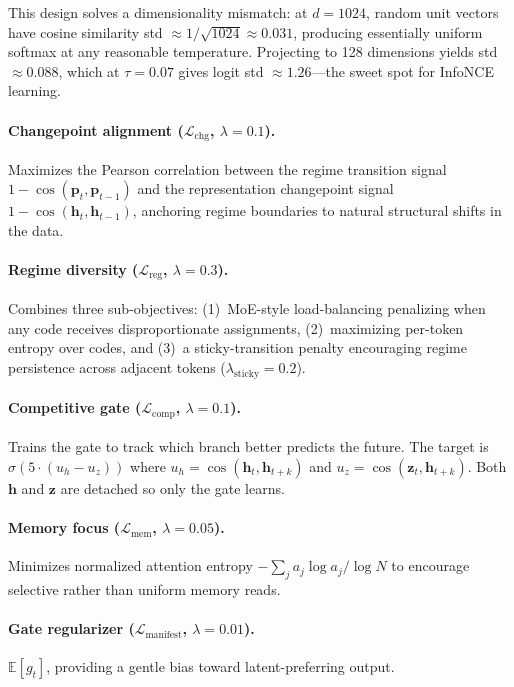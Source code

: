 \documentclass{article}
\begin{document}
This design solves a dimensionality mismatch: at $d{=}1024$, random unit
vectors have cosine similarity std ${\approx}1/\sqrt{1024} \approx 0.031$,
producing essentially uniform softmax at any reasonable temperature. Projecting
to 128 dimensions yields std ${\approx}0.088$, which at $\tau{=}0.07$ gives
logit std ${\approx}1.26$---the sweet spot for InfoNCE learning.

\paragraph{Changepoint alignment ($\mathcal{L}_\text{chg}$, $\lambda{=}0.1$).}
Maximizes the Pearson correlation between the regime transition signal
$1 - \cos(\mathbf{p}_t, \mathbf{p}_{t-1})$ and the representation changepoint
signal $1 - \cos(\mathbf{h}_t, \mathbf{h}_{t-1})$, anchoring regime boundaries
to natural structural shifts in the data.

\paragraph{Regime diversity ($\mathcal{L}_\text{reg}$, $\lambda{=}0.3$).}
\label{sec:regime_loss}
Combines three sub-objectives: (1)~MoE-style load-balancing penalizing when any
code receives disproportionate assignments, (2)~maximizing per-token entropy
over codes, and (3)~a sticky-transition penalty encouraging regime persistence
across adjacent tokens ($\lambda_\text{sticky}{=}0.2$).

\paragraph{Competitive gate ($\mathcal{L}_\text{comp}$, $\lambda{=}0.1$).}
Trains the gate to track which branch better predicts the future. The target is
$\sigma(5 \cdot (u_h - u_z))$ where $u_h = \cos(\mathbf{h}_t, \mathbf{h}_{t+k})$
and $u_z = \cos(\mathbf{z}_t, \mathbf{h}_{t+k})$. Both $\mathbf{h}$ and
$\mathbf{z}$ are detached so only the gate learns.

\paragraph{Memory focus ($\mathcal{L}_\text{mem}$, $\lambda{=}0.05$).}
Minimizes normalized attention entropy $-\sum_j a_j \log a_j / \log N$ to
encourage selective rather than uniform memory reads.

\paragraph{Gate regularizer ($\mathcal{L}_\text{manifest}$, $\lambda{=}0.01$).}
$\mathbb{E}[g_t]$, providing a gentle bias toward latent-preferring output.
\end{document}
